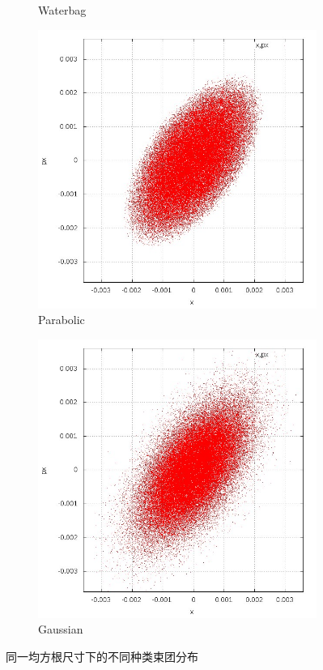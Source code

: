 \begin{figure}[!htb]
\begin{subfigure}[b]{0.48\textwidth}
        \caption{Waterbag}
    \end{subfigure}
    \begin{subfigure}[b]{0.48\textwidth}
        \includegraphics[width=\textwidth]{Img/PB_x_dx.jpg}
        \caption{Parabolic}
    \end{subfigure}
    \begin{subfigure}[b]{0.48\textwidth}
        \includegraphics[width=\textwidth]{Img/GS_x_dx.jpg}
        \caption{Gaussian}
    \end{subfigure}
    \caption{同一均方根尺寸下的不同种类束团分布}\label{fig:distribution}
\end{figure}

